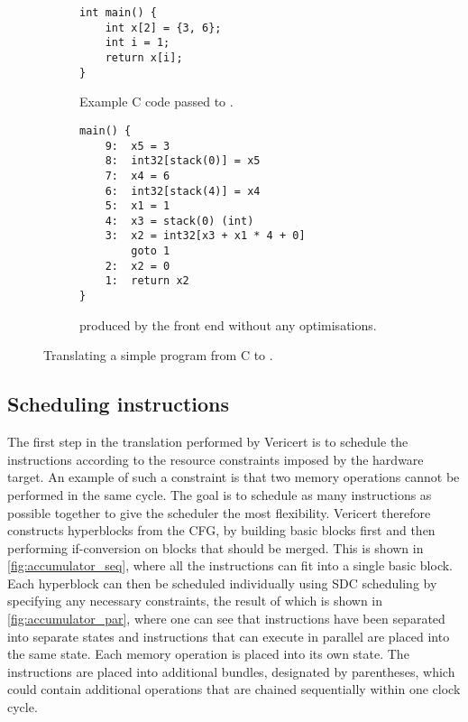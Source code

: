 \begin{figure}
  \centering
    \begin{subfigure}[b]{0.48\linewidth}
\begin{verbatim}
int main() {
    int x[2] = {3, 6};
    int i = 1;
    return x[i];
}
\end{verbatim}
      \caption{Example C code passed to \vericert{}.}\label{fig:accumulator_c}
    \end{subfigure}\hfill%
    \begin{subfigure}[b]{0.48\linewidth}
\begin{verbatim}
main() {
    9:  x5 = 3
    8:  int32[stack(0)] = x5
    7:  x4 = 6
    6:  int32[stack(4)] = x4
    5:  x1 = 1
    4:  x3 = stack(0) (int)
    3:  x2 = int32[x3 + x1 * 4 + 0]
        goto 1
    2:  x2 = 0
    1:  return x2
}
\end{verbatim}
      \caption{\rtl{} produced by the \compcert{} front end without any optimisations.}\label{fig:accumulator_rtl}
    \end{subfigure}
    \caption{Translating a simple program from C to \rtl{}.}\label{fig:accumulator_c_rtl}
\end{figure}

\subsection{Scheduling \rtl{} instructions}

The first step in the translation performed by Vericert is to schedule the
instructions according to the resource constraints imposed by the hardware
target.  An example of such a constraint is that two memory operations cannot be
performed in the same cycle.  The goal is to schedule as many instructions as
possible together to give the scheduler the most flexibility.  Vericert
therefore constructs hyperblocks from the \rtl{} \gls{CFG}, by building basic
blocks first and then performing if-conversion on blocks that should be merged.
This is shown in \cref{fig:accumulator_seq}, where all the instructions can fit
into a single basic block.  Each hyperblock can then be scheduled individually
using \gls{SDC} scheduling by specifying any necessary constraints, the result
of which is shown in \cref{fig:accumulator_par}, where one can see that
instructions have been separated into separate states and instructions that can
execute in parallel are placed into the same state.  Each memory operation is
placed into its own state.  The instructions are placed into additional bundles,
designated by parentheses, which could contain additional operations that are
chained sequentially within one clock cycle.

